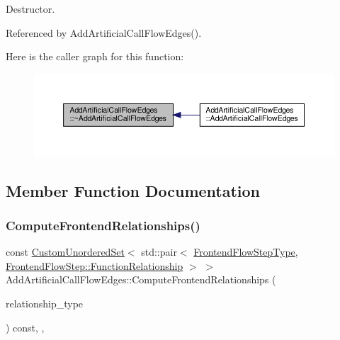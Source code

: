 Destructor. 



Referenced by Add\+Artificial\+Call\+Flow\+Edges().

Here is the caller graph for this function\+:
\nopagebreak
\begin{figure}[H]
\begin{center}
\leavevmode
\includegraphics[width=350pt]{d8/d4f/classAddArtificialCallFlowEdges_a8b1505efc13e743a2725ebb31c8404e2_icgraph}
\end{center}
\end{figure}


\subsection{Member Function Documentation}
\mbox{\label{classAddArtificialCallFlowEdges_a9e82def51141fd3a055e1cc4c80fd69c}} 
\subsubsection{\texorpdfstring{Compute\+Frontend\+Relationships()}{ComputeFrontendRelationships()}}
{\footnotesize\ttfamily const \hyperlink{classCustomUnorderedSet}{Custom\+Unordered\+Set}$<$ std\+::pair$<$ \hyperlink{frontend__flow__step_8hpp_afeb3716c693d2b2e4ed3e6d04c3b63bb}{Frontend\+Flow\+Step\+Type}, \hyperlink{classFrontendFlowStep_af7cf30f2023e5b99e637dc2058289ab0}{Frontend\+Flow\+Step\+::\+Function\+Relationship} $>$ $>$ Add\+Artificial\+Call\+Flow\+Edges\+::\+Compute\+Frontend\+Relationships (\begin{DoxyParamCaption}\item[{const \hyperlink{classDesignFlowStep_a723a3baf19ff2ceb77bc13e099d0b1b7}{Design\+Flow\+Step\+::\+Relationship\+Type}}]{relationship\+\_\+type }\end{DoxyParamCaption}) const\hspace{0.3cm}{\ttfamily [override]}, {\ttfamily [private]}, {\ttfamily [virtual]}}



